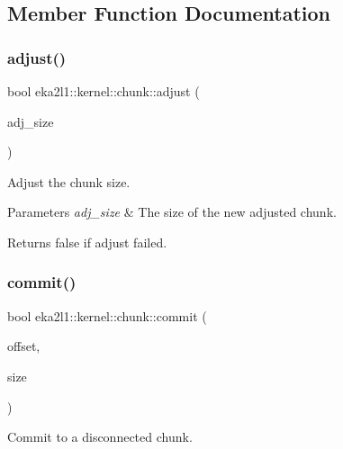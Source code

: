 \subsection{Member Function Documentation}
\mbox{\label{classeka2l1_1_1kernel_1_1chunk_a394122db5255ca7c97457eba9f74aa63}} 
\subsubsection{\texorpdfstring{adjust()}{adjust()}}
{\footnotesize\ttfamily bool eka2l1\+::kernel\+::chunk\+::adjust (\begin{DoxyParamCaption}\item[{size\+\_\+t}]{adj\+\_\+size }\end{DoxyParamCaption})}



Adjust the chunk size. 


\begin{DoxyParams}{Parameters}
{\em adj\+\_\+size} & The size of the new adjusted chunk. \\
\hline
\end{DoxyParams}
\begin{DoxyReturn}{Returns}
false if adjust failed. 
\end{DoxyReturn}
\mbox{\label{classeka2l1_1_1kernel_1_1chunk_ae9476aa5bdec25de98e9d097fc0b9440}} 
\subsubsection{\texorpdfstring{commit()}{commit()}}
{\footnotesize\ttfamily bool eka2l1\+::kernel\+::chunk\+::commit (\begin{DoxyParamCaption}\item[{uint32\+\_\+t}]{offset,  }\item[{size\+\_\+t}]{size }\end{DoxyParamCaption})}



Commit to a disconnected chunk. 

